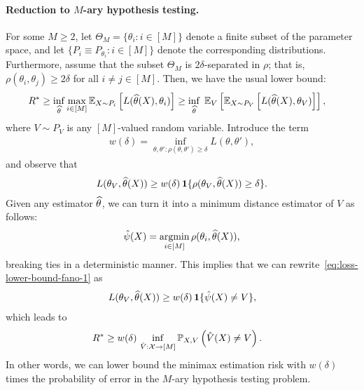 \documentclass[12pt]{article}
\begin{document}
\paragraph{Reduction to $M$-ary hypothesis testing.}  For some $M\geq 2$, let  $\Theta_M = \{\theta_i: i \in [M]\}$ denote a finite subset of the parameter space, and let $\{P_i \equiv P_{\theta_i}: i \in [M]\}$ denote the corresponding distributions. Furthermore, assume that the subset $\Theta_M$ is $2\delta$-separated in $\rho$; that is, $\rho(\theta_i, \theta_j) \geq 2\delta$ for all $ i \neq j \in [M]$. Then, we have the usual lower bound: 
\begin{align}
	R^* &\geq \inf_{\widehat{\theta}} \max_{i \in [M]} \mathbb{E}_{X \sim P_i} \left[ L(\widehat{\theta}(X), \theta_i) \right] 
	 \geq \inf_{\widehat{\theta}} \; \mathbb{E}_{V}\left[ \mathbb{E}_{X \sim P_V}\left[ L(\widehat{\theta}(X), \theta_V) \right] \right], 
\end{align}
where $V \sim P_V$ is any $[M]$-valued random variable. Introduce the term
\begin{align}
	w(\delta) = \inf_{\theta, \theta': \rho(\theta, \theta')\geq \delta} L(\theta, \theta'), 
\end{align}
and observe that 
\begin{align}
	L(\theta_V, \widehat{\theta}(X)) \geq w(\delta) \, \boldsymbol{1}\{ \rho(\theta_V, \widehat{\theta}(X)) \geq \delta \}. \label{eq:loss-lower-bound-fano-1}
\end{align}
Given any estimator $\widehat{\theta}$, we can turn it into a minimum distance estimator of $V$ as follows: 
\begin{align}
	\hat{\psi}(X) = \operatorname*{argmin}_{i \in [M]} \rho(\theta_i, \widehat{\theta}(X)), 
\end{align}
breaking ties in a deterministic manner. This implies that we can rewrite~\eqref{eq:loss-lower-bound-fano-1}  as 
\begin{align}
	L(\theta_V, \widehat{\theta}(X)) \geq w(\delta) \, \boldsymbol{1}\{ \hat{\psi}(X) \neq V \}, 
\end{align}
which leads to 
\begin{align}
	R^* & \geq w(\delta) \, \inf_{\hat{V}:{\cal X} \to [M]} \mathbb{P}_{X, V}\left( \hat{V}(X) \neq V \right). \label{eq:fano-lower-bound-1}
\end{align}
In other words, we can lower bound the minimax estimation risk with $w(\delta)$ times the probability of error in the $M$-ary hypothesis testing problem. 
\end{document}
